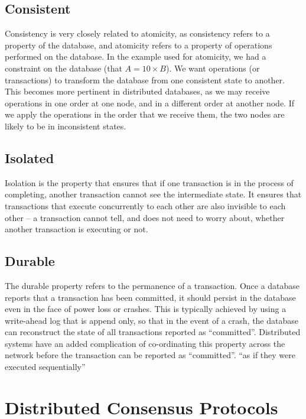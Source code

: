 \documentclass[12pt,twoside,notitlepage]{report}
\begin{document}
\subsection*{Consistent}

Consistency is very closely related to atomicity, as consistency refers to a property of the
database, and atomicity refers to a property of operations performed on the database. In the
example used for atomicity, we had a constraint on the database (that $A = 10\times B$). We want
operations (or transactions) to transform the database from one consistent state to another. This
becomes more pertinent in distributed databases, as we may receive operations in one order at one
node, and in a different order at another node. If we apply the operations in the order that we
receive them, the two nodes are likely to be in inconsistent states.

\subsection*{Isolated}

Isolation is the property that ensures that if one transaction is in the process of completing,
another transaction cannot see the intermediate state. It ensures that transactions that execute
concurrently to each other are also invisible to each other -- a transaction cannot tell, and does
not need to worry about, whether another transaction is executing or not.

\subsection*{Durable}

The durable property refers to the permanence of a transaction. Once a database reports that a
transaction has been committed, it should persist in the database even in the face of power loss or
crashes. This is typically achieved by using a write-ahead log that is append only, so that in the
event of a crash, the database can reconstruct the state of all transactions reported as
``committed''. Distributed systems have an added complication of co-ordinating this property
across the network before the transaction can be reported as ``committed''.
``as if they were executed sequentially''

\section{Distributed Consensus Protocols}
\end{document}

